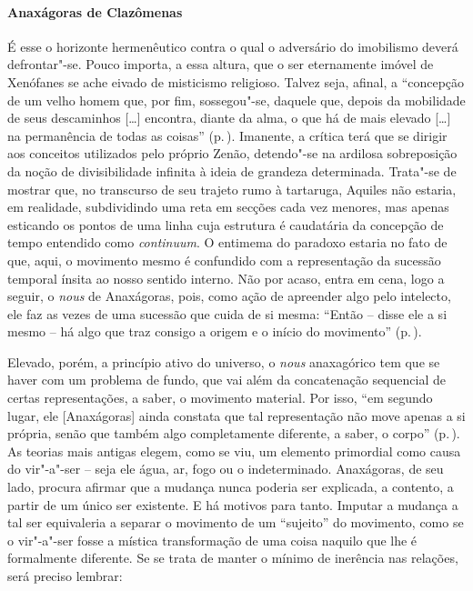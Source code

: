 \paragraph{Anaxágoras de Clazômenas} É esse o horizonte hermenêutico contra o
 qual o adversário do imobilismo deverá defrontar"-se. Pouco importa, a essa
 altura, que o ser eternamente imóvel de Xenófanes se ache eivado de
 misticismo religioso. Talvez seja, afinal, a ``concepção de um velho homem
 que, por fim, sossegou"-se, daquele que, depois da mobilidade de seus
 descaminhos [\ldots] encontra, diante da alma, o que há de mais elevado
 [\ldots] na permanência de todas as coisas'' (p.\,\pageref{velhohomem}). 
 Imanente, a crítica terá que se dirigir aos conceitos
 utilizados pelo próprio Zenão, detendo"-se na ardilosa sobreposição da noção
 de divisibilidade infinita à ideia de grandeza determinada. Trata"-se de
 mostrar que, no transcurso de seu trajeto rumo à tartaruga, Aquiles não
 estaria, em realidade, subdividindo uma reta em secções cada vez menores,
 mas apenas esticando os pontos de uma linha cuja estrutura é caudatária da
 concepção de tempo entendido como
\textit{continuum}. O entimema do paradoxo estaria no fato de que, aqui, o
 movimento mesmo é confundido com a representação da sucessão temporal ínsita
 ao nosso sentido interno. Não por acaso, entra em cena, logo a seguir,
 o \textit{nous} de Anaxágoras, pois, como ação de apreender algo pelo
 intelecto, ele faz as vezes de uma sucessão que cuida de si mesma:
 ``Então -- disse ele a si mesmo -- há algo que traz consigo a origem e o
 início do movimento'' (p.\,\pageref{aorigemeoinicio}).

Elevado, porém, a princípio ativo do universo, o \textit{nous} anaxagórico tem
que se haver com um problema de fundo, que vai além da concatenação
sequencial de certas representações, a saber, o movimento material. Por isso,
``em segundo lugar, ele [Anaxágoras] ainda constata que tal representação não
move apenas a si própria, senão que também algo completamente diferente, a
saber, o corpo'' (p.\,\pageref{asipropria}). As teorias mais antigas elegem,
como se viu, um elemento primordial como causa do vir"-a"-ser -- seja ele
água, ar, fogo ou o indeterminado. Anaxágoras, de seu lado, procura afirmar
que a mudança nunca poderia ser explicada, a contento, a partir de um único
ser existente. E há motivos para tanto. Imputar a mudança a tal ser
equivaleria a separar o movimento de um ``sujeito'' do movimento, como se o
vir"-a"-ser fosse a mística transformação de uma coisa naquilo que lhe é
formalmente diferente. Se se trata de manter o mínimo de inerência nas
relações, será preciso lembrar: 


